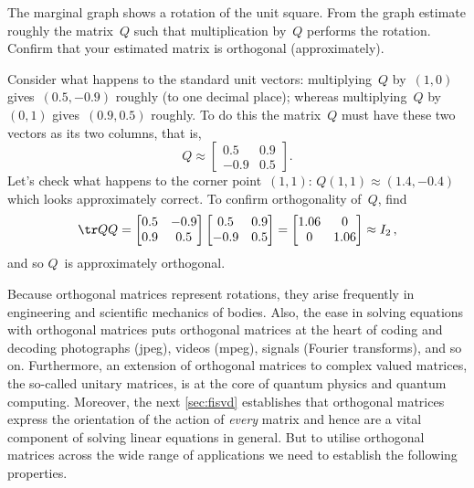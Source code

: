 \begin{example} \label{eg:introt}
The marginal graph shows a rotation of the unit square. 
\def\unithousesize{footnotesize,grid} 
%
From the graph estimate roughly the matrix~\(Q\) such that multiplication by~\(Q\) performs the rotation. 
Confirm that your estimated matrix is orthogonal (approximately).
\begin{solution} 
Consider what happens to the standard unit vectors:  multiplying~\(Q\) by~\((1,0)\) gives~\((0.5,-0.9)\) roughly (to one decimal place); whereas multiplying~\(Q\) by~\((0,1)\) gives~\((0.9,0.5)\) roughly.
To do this the matrix~\(Q\) must have these two vectors as its two columns, that is,
\begin{equation*}
Q\approx\begin{bmatrix} 0.5&0.9\\-0.9&0.5 \end{bmatrix}.
\end{equation*}
Let's check what happens to the corner point~\((1,1)\): \(Q(1,1)\approx (1.4,-0.4)\) which looks approximately correct.
To confirm orthogonality of~\(Q\), find
\begin{equation*}
\tr QQ=\begin{bmatrix} 0.5&-0.9\\0.9&0.5 \end{bmatrix}
\begin{bmatrix} 0.5&0.9\\-0.9&0.5 \end{bmatrix}
=\begin{bmatrix} 1.06&0\\0&1.06 \end{bmatrix}\approx I_2\,,
\end{equation*}
and so \(Q\)~is approximately orthogonal.
\end{solution}
\end{example}


Because orthogonal matrices represent rotations, they arise frequently in engineering and scientific mechanics of bodies.
Also, the ease in solving equations with orthogonal matrices puts orthogonal matrices at the heart of coding and decoding photographs (jpeg), videos (mpeg), signals (Fourier transforms), and so on.
Furthermore, an extension of orthogonal matrices to complex valued matrices, the so-called unitary matrices, is at the core of quantum physics and quantum computing.
Moreover, the next \autoref{sec:fisvd} establishes that orthogonal matrices express the orientation of the action of \emph{every} matrix and hence are a vital component of solving linear equations in general.
But to utilise orthogonal matrices across the wide range of applications we need to establish the following properties.




